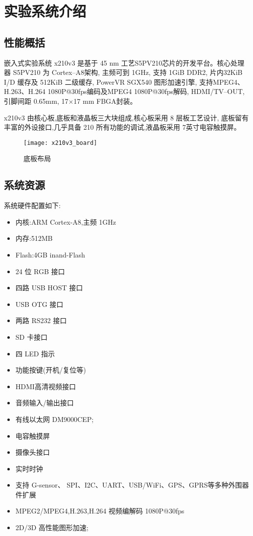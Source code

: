 \chapter{实验系统介绍}

\section{性能概括}

	嵌入式实验系统 x210v3 是基于 45 nm 工艺S5PV210芯片的开发平台。核心处理器
S5PV210 为 Cortex--A8架构, 主频可到 1GHz, 支持 1GiB DDR2, 片内32KiB I/D 缓存及
512KiB 二级缓存, PowerVR SGX540 图形加速引擎, 支持MPEG4、H.263、H.264 
1080P@30fps编码及MPEG4 1080P@30fps解码, HDMI/TV--OUT, 引脚间距 0.65mm, 
17$\times$17 mm FBGA封装。

	x210v3 由核心板,底板和液晶板三大块组成,核心板采用 8 层板工艺设计,  底板留有
丰富的外设接口,几乎具备 210 所有功能的调试,液晶板采用 7英寸电容触摸屏。

\begin{figure}
\centering
\texttt{[image: x210v3\_board]}
\caption{底板布局}
\end{figure}

\section{系统资源}

	系统硬件配置如下:

\begin{itemize}\itemsep=-3pt
  \item 内核:ARM Cortex-A8,主频 1GHz
  \item 内存:512MB
  \item Flash:4GB inand-Flash
  \item 24 位 RGB 接口
  \item 四路 USB HOST 接口
  \item USB OTG 接口
  \item 两路 RS232 接口
  \item SD 卡接口
  \item 四 LED 指示
  \item 功能按键(开机/复位等)
  \item HDMI高清视频接口
  \item 音频输入/输出接口
  \item 有线以太网 DM9000CEP;
  \item 电容触摸屏
  \item 摄像头接口
  \item 实时时钟
  \item 支持 G-sensor、 SPI、I2C、UART、USB/WiFi、GPS、GPRS等多种外围器件扩展
  \item MPEG2/MPEG4,H.263,H.264 视频编解码 1080P@30fps
  \item 2D/3D 高性能图形加速;
\end{itemize}


